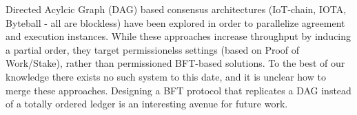 Directed Acylcic Graph (DAG) based consensus architectures \cite{pervez2018comparative}(IoT-chain, IOTA, Byteball - all are blockless) have been explored  in order to parallelize agreement and execution instances. While these approaches increase throughput by inducing a partial order, they target permissionelss settings (based on Proof of Work/Stake), rather than permissioned BFT-based solutions. To the best of our knowledge there exists no such system to this date, and it is unclear how to merge these approaches. Designing a BFT protocol that replicates a DAG instead of a totally ordered ledger is an interesting avenue for future work.







